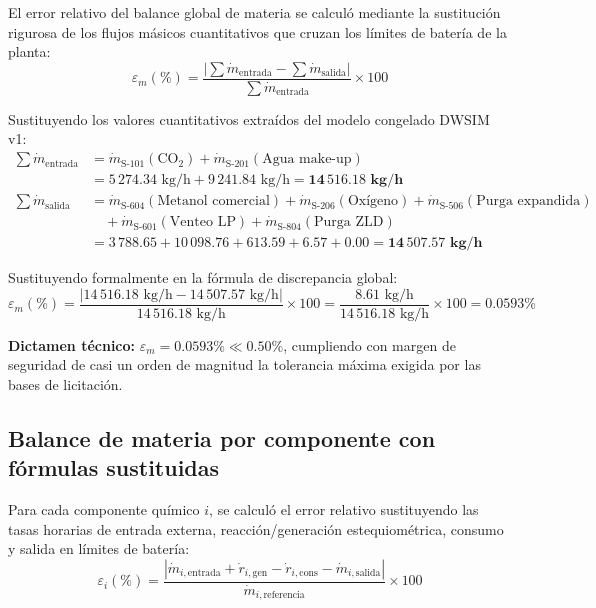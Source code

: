 \documentclass[11pt,letterpaper]{article}
\begin{document}
El error relativo del balance global de materia se calculó mediante la sustitución rigurosa de los flujos másicos cuantitativos que cruzan los límites de batería de la planta:
\begin{equation}
\varepsilon_m(\%) = \frac{\left|\sum \dot{m}_{\text{entrada}} - \sum \dot{m}_{\text{salida}}\right|}{\sum \dot{m}_{\text{entrada}}} \times 100
\end{equation}

Sustituyendo los valores cuantitativos extraídos del modelo congelado DWSIM v1:
\begin{align*}
\sum \dot{m}_{\text{entrada}} &= \dot{m}_{\text{S-101}}(\text{CO}_2) + \dot{m}_{\text{S-201}}(\text{Agua make-up}) \\
&= 5\,274.34\text{ kg/h} + 9\,241.84\text{ kg/h} = \mathbf{14\,516.18\text{ kg/h}} \\[4pt]
\sum \dot{m}_{\text{salida}} &= \dot{m}_{\text{S-604}}(\text{Metanol comercial}) + \dot{m}_{\text{S-206}}(\text{Oxígeno}) + \dot{m}_{\text{S-506}}(\text{Purga expandida}) \\
&\quad + \dot{m}_{\text{S-601}}(\text{Venteo LP}) + \dot{m}_{\text{S-804}}(\text{Purga ZLD}) \\
&= 3\,788.65 + 10\,098.76 + 613.59 + 6.57 + 0.00 = \mathbf{14\,507.57\text{ kg/h}}
\end{align*}

Sustituyendo formalmente en la fórmula de discrepancia global:
\begin{equation}
\varepsilon_m(\%) = \frac{\left| 14\,516.18\text{ kg/h} - 14\,507.57\text{ kg/h}\right|}{14\,516.18\text{ kg/h}} \times 100 = \frac{8.61\text{ kg/h}}{14\,516.18\text{ kg/h}} \times 100 = \mathbf{0.0593\%}
\end{equation}

\textbf{Dictamen técnico:} $\varepsilon_m = 0.0593\% \ll 0.50\%$, cumpliendo con margen de seguridad de casi un orden de magnitud la tolerancia máxima exigida por las bases de licitación.

\vspace{0.2cm}
\subsection{Balance de materia por componente con fórmulas sustituidas}

Para cada componente químico $i$, se calculó el error relativo sustituyendo las tasas horarias de entrada externa, reacción/generación estequiométrica, consumo y salida en límites de batería:
\begin{equation}
\varepsilon_i(\%) = \frac{\left|\dot{m}_{i,\text{entrada}} + \dot{r}_{i,\text{gen}} - \dot{r}_{i,\text{cons}} - \dot{m}_{i,\text{salida}}\right|}{\dot{m}_{i,\text{referencia}}} \times 100
\end{equation}
\end{document}
